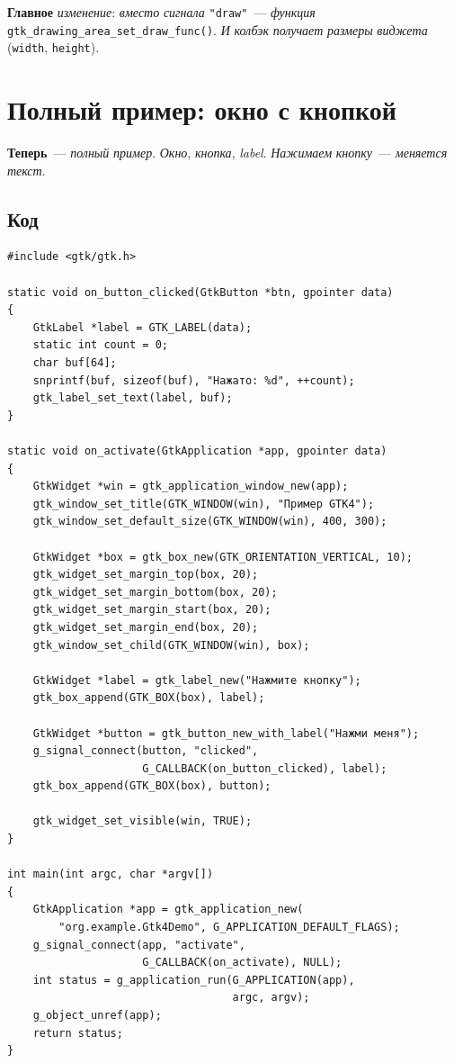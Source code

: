\begin{keybox}
\textbf{Главное} \emph{изменение}: \emph{вместо} \emph{сигнала}
\texttt{"draw"}~--- \emph{функция}
\texttt{gtk\_drawing\_area\_set\_draw\_func()}. \emph{И}
\emph{колбэк} \emph{получает} \emph{размеры} \emph{виджета}
(\texttt{width}, \texttt{height}).
\end{keybox}






\section{Полный пример: окно с кнопкой}
\label{sec:gtk4-example}

\textbf{Теперь}~--- \emph{полный} \emph{пример}. \emph{Окно},
\emph{кнопка}, \emph{label}. \emph{Нажимаем} \emph{кнопку}~---
\emph{меняется} \emph{текст}.

\subsection{Код}

\begin{listing}[htbp]
\begin{verbatim}
#include <gtk/gtk.h>

static void on_button_clicked(GtkButton *btn, gpointer data)
{
    GtkLabel *label = GTK_LABEL(data);
    static int count = 0;
    char buf[64];
    snprintf(buf, sizeof(buf), "Нажато: %d", ++count);
    gtk_label_set_text(label, buf);
}

static void on_activate(GtkApplication *app, gpointer data)
{
    GtkWidget *win = gtk_application_window_new(app);
    gtk_window_set_title(GTK_WINDOW(win), "Пример GTK4");
    gtk_window_set_default_size(GTK_WINDOW(win), 400, 300);

    GtkWidget *box = gtk_box_new(GTK_ORIENTATION_VERTICAL, 10);
    gtk_widget_set_margin_top(box, 20);
    gtk_widget_set_margin_bottom(box, 20);
    gtk_widget_set_margin_start(box, 20);
    gtk_widget_set_margin_end(box, 20);
    gtk_window_set_child(GTK_WINDOW(win), box);

    GtkWidget *label = gtk_label_new("Нажмите кнопку");
    gtk_box_append(GTK_BOX(box), label);

    GtkWidget *button = gtk_button_new_with_label("Нажми меня");
    g_signal_connect(button, "clicked",
                     G_CALLBACK(on_button_clicked), label);
    gtk_box_append(GTK_BOX(box), button);

    gtk_widget_set_visible(win, TRUE);
}

int main(int argc, char *argv[])
{
    GtkApplication *app = gtk_application_new(
        "org.example.Gtk4Demo", G_APPLICATION_DEFAULT_FLAGS);
    g_signal_connect(app, "activate",
                     G_CALLBACK(on_activate), NULL);
    int status = g_application_run(G_APPLICATION(app),
                                   argc, argv);
    g_object_unref(app);
    return status;
}
\end{verbatim}
\caption{Полный пример GTK4: окно, кнопка, label}
\label{lst:gtk4-example}
\end{listing}

